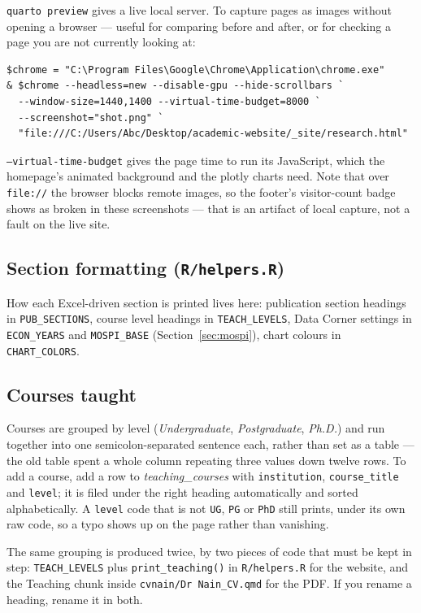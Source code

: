 \documentclass[11pt,a4paper]{article}
\newcommand{\file}[1]{\texttt{#1}}
\begin{document}
\texttt{quarto preview} gives a live local server. To capture pages as
images without opening a browser --- useful for comparing before and after,
or for checking a page you are not currently looking at:

\begin{lstlisting}
$chrome = "C:\Program Files\Google\Chrome\Application\chrome.exe"
& $chrome --headless=new --disable-gpu --hide-scrollbars `
  --window-size=1440,1400 --virtual-time-budget=8000 `
  --screenshot="shot.png" `
  "file:///C:/Users/Abc/Desktop/academic-website/_site/research.html"
\end{lstlisting}

\texttt{--virtual-time-budget} gives the page time to run its JavaScript,
which the homepage's animated background and the plotly charts need.
Note that over \texttt{file://} the browser blocks remote images, so the
footer's visitor-count badge shows as broken in these screenshots --- that
is an artifact of local capture, not a fault on the live site.

\subsection{Section formatting (\file{R/helpers.R})}
How each Excel-driven section is printed lives here: publication section
headings in \texttt{PUB\_SECTIONS}, course level headings in
\texttt{TEACH\_LEVELS}, Data Corner settings in \texttt{ECON\_YEARS} and
\texttt{MOSPI\_BASE} (Section~\ref{sec:mospi}), chart colours in
\texttt{CHART\_COLORS}.

\subsection{Courses taught}
Courses are grouped by level (\emph{Undergraduate}, \emph{Postgraduate},
\emph{Ph.D.}) and run together into one semicolon-separated sentence each,
rather than set as a table --- the old table spent a whole column repeating
three values down twelve rows. To add a course, add a row to
\emph{teaching\_courses} with \texttt{institution}, \texttt{course\_title}
and \texttt{level}; it is filed under the right heading automatically and
sorted alphabetically. A \texttt{level} code that is not \texttt{UG},
\texttt{PG} or \texttt{PhD} still prints, under its own raw code, so a typo
shows up on the page rather than vanishing.

The same grouping is produced twice, by two pieces of code that must be
kept in step: \texttt{TEACH\_LEVELS} plus \texttt{print\_teaching()} in
\file{R/helpers.R} for the website, and the Teaching chunk inside
\file{cvnain/Dr Nain\_CV.qmd} for the PDF. If you rename a heading, rename
it in both.
\end{document}
